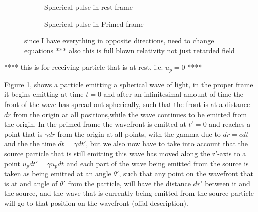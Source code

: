 \begin{figure}[ht]
\begin{subfigure}{.49\textwidth}
\caption{Spherical pulse in rest frame}
\end{subfigure}
\begin{subfigure}{.49\textwidth}
\caption{Spherical pulse in Primed frame}
\end{subfigure}
\caption{ since I have everything in opposite directions, need to change equations *** also this is full blown relativity not just retarded field }
\label{fig: Doppler effect appendix}
\end{figure}
**** this is for receiving particle that is at rest, i.e. $u_p=0$ ****

Figure \ref{fig: Doppler effect appendix}, shows a particle emitting a spherical wave of light, in the proper frame it begins emitting at time $t=0$ and after an infinitesimal amount of time the front of the wave has spread out spherically, such that the front is at a distance $dr$ from the origin at all positions,while the wave continues to be emitted from the origin. In the primed frame the wavefront is emitted at $t'=0$ and reaches a point that is $\gamma dr$ from the origin at all points, with the gamma due to $dr=cdt$ and the the time $dt=\gamma dt'$, but we also now have to take into account that the source particle that is still emitting this wave has moved along the z'-axis to a point $u_p dt'= \gamma u_p dt$ and each part of the wave being emitted from the source is taken as being emitted at an angle $\theta'$, such that any point on the wavefront that is at and angle of $\theta'$ from the particle, will have the distance $dr'$ between it and the source, and the wave that is currently being emitted from the source particle will go to that position on the wavefront (offal description).

